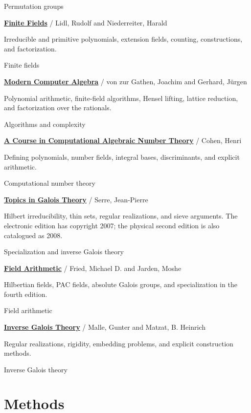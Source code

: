 \documentclass[11pt,a4paper,oneside,openany]{book}
\begin{document}
{\small Permutation groups}\par\medskip
{}\textbf{\hyperlink{ref:LidlNiederreiter1997}{Finite Fields}} / Lidl, Rudolf and Niederreiter, Harald\par
Irreducible and primitive polynomials, extension fields, counting, constructions, and factorization.\par
{\small Finite fields}\par\medskip
{}\textbf{\hyperlink{ref:GathenGerhard2013}{Modern Computer Algebra}} / von zur Gathen, Joachim and Gerhard, Jürgen\par
Polynomial arithmetic, finite-field algorithms, Hensel lifting, lattice reduction, and factorization over the rationals.\par
{\small Algorithms and complexity}\par\medskip
{}\textbf{\hyperlink{ref:Cohen1993}{A Course in Computational Algebraic Number Theory}} / Cohen, Henri\par
Defining polynomials, number fields, integral bases, discriminants, and explicit arithmetic.\par
{\small Computational number theory}\par\medskip
{}\textbf{\hyperlink{ref:Serre2007Topics}{Topics in Galois Theory}} / Serre, Jean-Pierre\par
Hilbert irreducibility, thin sets, regular realizations, and sieve arguments. The electronic edition has copyright 2007; the physical second edition is also catalogued as 2008.\par
{\small Specialization and inverse Galois theory}\par\medskip
{}\textbf{\hyperlink{ref:FriedJarden2023}{Field Arithmetic}} / Fried, Michael D. and Jarden, Moshe\par
Hilbertian fields, PAC fields, absolute Galois groups, and specialization in the fourth edition.\par
{\small Field arithmetic}\par\medskip
{}\textbf{\hyperlink{ref:MalleMatzat2018}{Inverse Galois Theory}} / Malle, Gunter and Matzat, B. Heinrich\par
Regular realizations, rigidity, embedding problems, and explicit construction methods.\par
{\small Inverse Galois theory}\par\medskip
\chapter{Methods}
\end{document}
